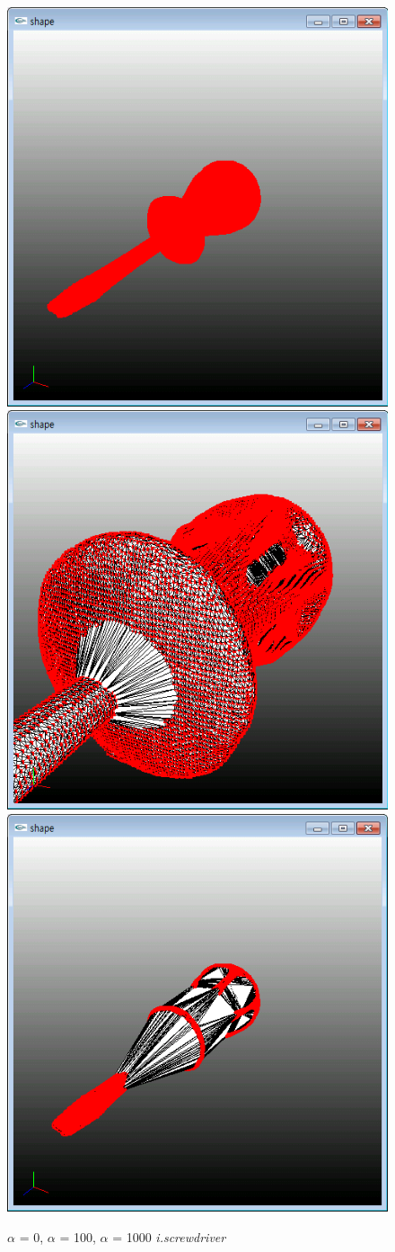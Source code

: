 \documentclass[11pt]{article}
\begin{document}
\begin{figure}[ht]
\includegraphics[width=.5\textwidth]{FIGS/alpha0-iscrewdriver}
\hspace{1cm}
\includegraphics[width=.5\textwidth]{FIGS/alpha100-iscrewdriver}
\vspace{1cm}
\includegraphics[width=.5\textwidth]{FIGS/alpha1000-iscrewdriver}
\caption{$\alpha$ = 0, $\alpha$ = 100, $\alpha$ = 1000 \textit{i.screwdriver}}
\end{figure}
\end{document}
